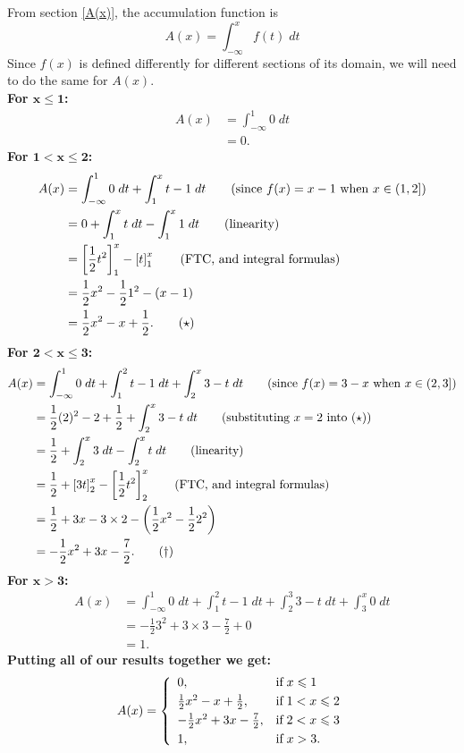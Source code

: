 \noindent From section \ref{A(x)}, the accumulation function is
\[
A(x) = \int_{-\infty}^x f(t) \; dt
\]
Since $f(x)$ is defined differently for different sections of its domain, we will need to do the same for $A(x)$. \\
\textbf{For $\boldsymbol{x \leq 1}$:}
\begin{align*}
A(x)  & = \int_{-\infty}^1 0 \; dt  \\
	& = 0.
\end{align*}
\textbf{For $\boldsymbol{1 < x \leq 2}$:}
\begin{align*}
A(x)  & =  \int_{-\infty}^1 0 \; dt + \int_{1}^x t - 1 \; dt  \tag{since $f(x) = x-1$ when $x \in (1,2]$}\\
	& = 0 +  \int_{1}^x t \; dt - \int_1^x 1 \; dt \tag{linearity} \\
	& = \left[\frac{1}{2}t^2\right]_1^x - \left[t\right]_1^x \tag{FTC, and integral formulas} \\
	& = \frac{1}{2}x^2 - \frac{1}{2}1^2 - \left(x - 1\right) \\
	& = \frac{1}{2}x^2 - x + \frac{1}{2}. \tag{$\star$}
\end{align*}
\textbf{For $\boldsymbol{2 < x \leq 3}$:}
\begin{align*}
A(x)  & =  \int_{-\infty}^1 0 \; dt + \int_{1}^2 t - 1 \; dt + \int_2^x 3-t \; dt \tag{since $f(x) = 3-x$ when $x \in (2,3]$} \\
	& = \frac{1}{2}(2)^2 - 2 + \frac{1}{2} + \int_2^x 3-t \; dt \tag{substituting $x = 2$ into ($\star$)} \\
	& = \frac{1}{2} + \int_2^x 3 \; dt - \int_2^x t \; dt \tag{linearity} \\
	& = \frac{1}{2} + \left[3t\right]_2^x - \left[\frac{1}{2}t^2\right]^x_2 \tag{FTC, and integral formulas} \\
	& = \frac{1}{2} + 3x - 3\times2 - \left(\frac{1}{2}x^2 - \frac{1}{2}2^2\right) \\
	& = -\frac{1}{2}x^2 + 3x - \frac{7}{2}. \tag{$\dagger$}
\end{align*}
\textbf{For $\boldsymbol{x > 3}$:}
\begin{align*}
A(x)  & =  \int_{-\infty}^1 0 \; dt + \int_{1}^2 t - 1 \; dt + \int_2^3 3-t \; dt + \int_3^x 0 \; dt \tag{since $f(x) = 0$ when $x > 3$} \\
	& = - \frac{1}{2}3^2 + 3\times3 - \frac{7}{2} + 0 \tag{substituting $x = 3$ into ($\dagger$)} \\
	& = 1.
\end{align*}
\textbf{Putting all of our results together we get:}
\[
A(x) = \left\{
  \begin{array}{ll}
    0, & \text{if} \; x \leq 1 \smallskip \\
    \frac{1}{2}x^2 - x + \frac{1}{2}, & \text{if} \; 1 < x \leq 2 \smallskip \\
    -\frac{1}{2}x^2 + 3x - \frac{7}{2}, & \text{if} \; 2 < x \leq 3 \smallskip \\
    1,& \text{if} \; x > 3.
  \end{array}
\right.
\]